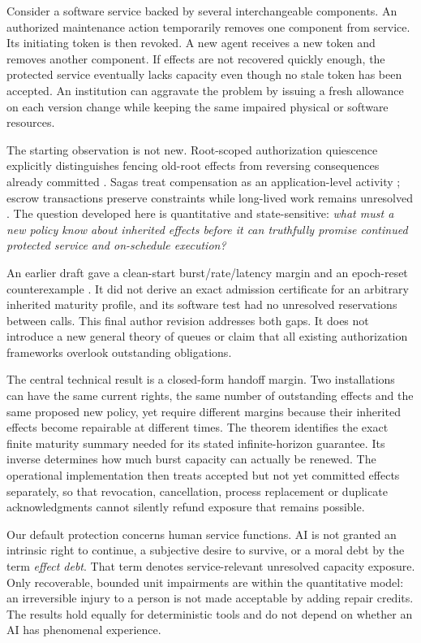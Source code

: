 \documentclass[11pt,a4paper]{article}
\theoremstyle{definition}\newtheorem{definition}{Definition}
\begin{document}
Consider a software service backed by several interchangeable components. An authorized maintenance action temporarily removes one component from service. Its initiating token is then revoked. A new agent receives a new token and removes another component. If effects are not recovered quickly enough, the protected service eventually lacks capacity even though no stale token has been accepted. An institution can aggravate the problem by issuing a fresh allowance on each version change while keeping the same impaired physical or software resources.

The starting observation is not new. Root-scoped authorization quiescence explicitly distinguishes fencing old-root effects from reversing consequences already committed \cite{quiescence}. Sagas treat compensation as an application-level activity \cite{sagas}; escrow transactions preserve constraints while long-lived work remains unresolved \cite{escrow}. The question developed here is quantitative and state-sensitive: \emph{what must a new policy know about inherited effects before it can truthfully promise continued protected service and on-schedule execution?}

An earlier draft gave a clean-start burst/rate/latency margin and an epoch-reset counterexample \cite{draft}. It did not derive an exact admission certificate for an arbitrary inherited maturity profile, and its software test had no unresolved reservations between calls. This final author revision addresses both gaps. It does not introduce a new general theory of queues or claim that all existing authorization frameworks overlook outstanding obligations.

The central technical result is a closed-form handoff margin. Two installations can have the same current rights, the same number of outstanding effects and the same proposed new policy, yet require different margins because their inherited effects become repairable at different times. The theorem identifies the exact finite maturity summary needed for its stated infinite-horizon guarantee. Its inverse determines how much burst capacity can actually be renewed. The operational implementation then treats accepted but not yet committed effects separately, so that revocation, cancellation, process replacement or duplicate acknowledgments cannot silently refund exposure that remains possible.

Our default protection concerns human service functions. AI is not granted an intrinsic right to continue, a subjective desire to survive, or a moral debt by the term \emph{effect debt}. That term denotes service-relevant unresolved capacity exposure. Only recoverable, bounded unit impairments are within the quantitative model: an irreversible injury to a person is not made acceptable by adding repair credits. The results hold equally for deterministic tools and do not depend on whether an AI has phenomenal experience.
\end{document}
